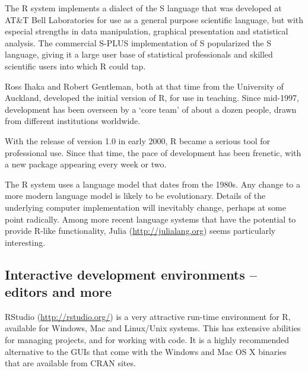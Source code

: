 The R system implements a dialect of the S language 
that was developed at AT\&T Bell Laboratories for use as
a general purpose scientific language, but with especial strengths in
data manipulation, graphical presentation and statistical
analysis. The commercial S-PLUS implementation of S popularized the S
language, giving it a large user base of statistical professionals and
skilled scientific users into which R could tap.

Ross Ihaka and Robert Gentleman, both at that time from the University
of Auckland, developed the initial version of R, for use in teaching.
Since mid-1997, development has been overseen by a `core team'
of about a dozen people, drawn from different institutions worldwide.

With the release of version 1.0 in early 2000, R became a serious tool
for professional use.  Since that time, the pace of development has
been frenetic, with a new package appearing every week or two.

The R system uses a language model that dates from the
1980s.  Any change to a more modern language model is likely to be
evolutionary.  Details of the underlying computer implementation will
inevitably change, perhaps at some point radically. Among
more recent language systems   that have the potential to provide R-like functionality,
Julia (\url{http://julialang.org}) seems particularly interesting.

  \subsection*{Interactive development environments -- editors and more}
    RStudio
  (\url{http://rstudio.org/}) is a very attractive run-time
  environment for R, available for Windows, Mac and Linux/Unix
  systems.  This has extensive abilities for managing projects, and
  for working with code.  It is a highly recommended alternative to
  the GUIs that come with the Windows and Mac OS X binaries that are
  available from CRAN sites.

